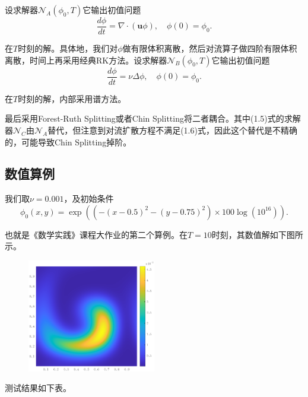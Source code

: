 \documentclass[lang=cn,10pt,bibend=bibtex]{elegantbook}
\begin{document}
设求解器$\mathcal{N}_A(\phi_0,T)$它输出初值问题
\begin{equation}
    \frac{d\phi}{dt}=\nabla\cdot(\mathbf{u}\phi),\quad \phi(0)=\phi_0.
\end{equation}

在$T$时刻的解。具体地，我们对$\phi$做有限体积离散，然后对流算子做四阶有限体积离散，时间上再采用经典RK方法。设求解器$\mathcal{N}_B(\phi_0,T)$它输出初值问题
\begin{equation}
    \frac{d\phi}{dt}=\nu \Delta\phi,\quad \phi(0)=\phi_0.
\end{equation}

在$T$时刻的解，内部采用谱方法。

最后采用Forest-Ruth Splitting或者Chin Splitting将二者耦合。其中(1.5)式的求解器$\mathcal{N}_C$由$\mathcal{N}_A$替代，但注意到对流扩散方程不满足(1.6)式，因此这个替代是不精确的，可能导致Chin Splitting掉阶。

\vspace{-.5em}

\subsection{数值算例}

我们取$\nu=0.001$，及初始条件
\begin{equation}
    \phi_0(x,y)=\exp((-(x-0.5)^2-(y-0.75)^2)\times 100\log(10^{16})).
\end{equation}

也就是《数学实践》课程大作业的第二个算例。在$T=10$时刻，其数值解如下图所示。

\vspace{-1em}
\begin{figure}[H]
    \centering
    \includegraphics[width=0.5\textwidth]{eps/AdvDif.eps}
\end{figure}

测试结果如下表。
\end{document}
